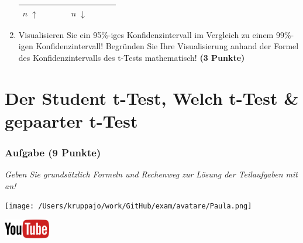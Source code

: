 \documentclass[a4paper, 9pt]{scrartcl}\usepackage[]{graphicx}\usepackage[]{xcolor}
\begin{document}
\begin{enumerate}
\begin{center}
\begin{tabular}[c]{l|c|c|c|l|c|c|c}
    \hline
        \textbf{$n\; \uparrow$} & \hspace{1.8cm} & \hspace{1.8cm}  & \hspace{1.8cm} & \textbf{
                                                          $n\; \downarrow$} &
                                                                          \hspace{1.8cm}
                                                & \hspace{1.8cm}  & \hspace{1.8cm}\strut\\
    \hline
  \end{tabular}
\end{center}
\item Visualisieren Sie ein 95\%-iges Konfidenzintervall im Vergleich
  zu einem 99\%-igen Konfidenzintervall! Begr{\"u}nden Sie Ihre Visualisierung anhand der Formel
  des Konfidenzintervalls des t-Tests mathematisch! \textbf{(3 Punkte)} 
\end{enumerate} 
\clearpage
\part{Der Student t-Test, Welch t-Test \& gepaarter t-Test}

\section{Aufgabe \hfill (9 Punkte)}

\textit{Geben Sie grundsätzlich Formeln und Rechenweg zur Lösung der Teilaufgaben mit an!} \\[1Ex]
 

 
\begin{minipage}[t]{0.5\textwidth}
\texttt{[image: /Users/kruppajo/work/GitHub/exam/avatare/Paula.png]}
\end{minipage}
\begin{minipage}[t]{0.5\textwidth}
\hfill
\href{https://youtu.be/eejS2uG4o-M}{\includegraphics[width = 2cm]{img/youtube}}\\[1Ex]
\end{minipage}
\vspace{1ex}
\end{document}
